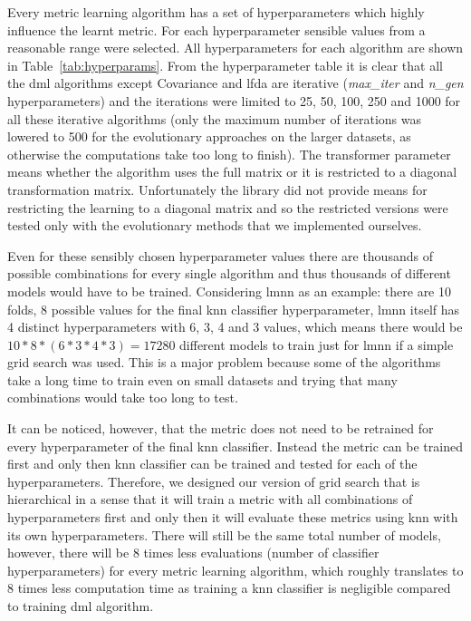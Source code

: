 \documentclass[12pt,a4paper]{report}
\begin{document}
Every metric learning algorithm has a set of hyperparameters which highly influence the learnt metric. For each hyperparameter sensible values from a reasonable range were selected. All hyperparameters for each algorithm are shown in Table~\ref{tab:hyperparams}. From the hyperparameter table it is clear that all the \ac{dml} algorithms except Covariance and \ac{lfda} are iterative (\textit{max\_iter} and \textit{n\_gen} hyperparameters) and the iterations were limited to 25, 50, 100, 250 and 1000 for all these iterative algorithms (only the maximum number of iterations was lowered to 500 for the evolutionary approaches on the larger datasets, as otherwise the computations take too long to finish). The transformer parameter means whether the algorithm uses the full matrix or it is restricted to a diagonal transformation matrix. Unfortunately the library did not provide means for restricting the learning to a diagonal matrix and so the restricted versions were tested only with the evolutionary methods that we implemented ourselves.



Even for these sensibly chosen hyperparameter values there are thousands of possible combinations for every single algorithm and thus thousands of different models would have to be trained. Considering \ac{lmnn} as an example: there are 10 folds, 8 possible values for the final \ac{knn} classifier hyperparameter, \ac{lmnn} itself has 4 distinct hyperparameters with 6, 3, 4 and 3 values, which means there would be $10*8*(6*3*4*3)=17280$ different models to train just for \ac{lmnn} if a simple grid search was used. This is a major problem because some of the algorithms take a long time to train even on small datasets and trying that many combinations would take too long to test.

It can be noticed, however, that the metric does not need to be retrained for every hyperparameter of the final \ac{knn} classifier. Instead the metric can be trained first and only then \ac{knn} classifier can be trained and tested for each of the hyperparameters. Therefore, we designed our version of grid search that is hierarchical in a sense that it will train a metric with all combinations of hyperparameters first and only then it will evaluate these metrics using \ac{knn} with its own hyperparameters. There will still be the same total number of models, however, there will be 8 times less evaluations (number of classifier hyperparameters) for every metric learning algorithm, which roughly translates to 8 times less computation time as training a \ac{knn} classifier is negligible compared to training \ac{dml} algorithm.
\end{document}

